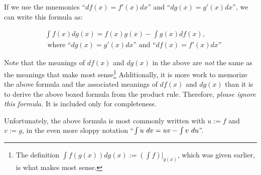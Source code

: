 \begin{itemize}
    If we use the mnemonics ``$df(x) = f'(x) dx$'' and ``$dg(x) = g'(x) dx$'', we can write this formula as:

    \begin{align*}
        &\int f(x) dg(x) = f(x) g(x) - \int g(x) df(x), \\
        &\text{ where ``$dg(x) = g'(x) dx$'' and ``$df(x) = f'(x) dx$''}
    \end{align*}

    Note that the meanings of $df(x)$ and $dg(x)$ in the above are \textit{not} the same as the meanings that make most sense\footnote{The definition $\int f(g(x)) dg(x) := (\int f)|_{g(x)}$, which was given earlier, is what makes most sense.} Additionally, it is more work to memorize the above formula and the associated meanings of $df(x)$ and $dg(x)$ than it is to derive the above boxed formula from the product rule. Therefore, \textit{please ignore this formula.} It is included only for completeness.

    Unfortunately, the above formula is most commonly written with $u := f$ and $v := g$, in the even more sloppy notation ``${\int u \text{ } dv = uv - \int v \text{ } du}$''.
\end{itemize}